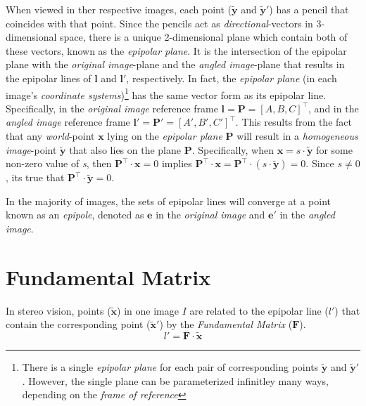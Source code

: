 \par When viewed in ther respective images, each point ($\mathbf{\tilde{y}}$ and $\mathbf{\tilde{y}'}$) has a pencil that coincides with that point. Since the pencils act as \textit{directional}-vectors in 3-dimensional space, there is a unique 2-dimensional plane which contain both of these vectors, known as the \textit{epipolar plane}. It is the intersection of the epipolar plane with the \textit{original image}-plane and the \textit{angled image}-plane that results in the epipolar lines of $\mathbf{l}$ and $\mathbf{l'}$, respectively. In fact, the \textit{epipolar plane} (in each image's \textit{coordinate systems})\footnote{There is a single \textit{epipolar plane} for each pair of corresponding points $\mathbf{\tilde{y}}$ and $\mathbf{\tilde{y}'}$. However, the single plane can be parameterized infinitley many ways, depending on the \textit{frame of reference}} has the same vector form as its epipolar line. Specifically, in the \textit{original image} reference frame $\mathbf{l}=\mathbf{P}=[A,B,C]^\intercal$, and in the \textit{angled image} reference frame $\mathbf{l'}=\mathbf{P'}=[A',B',C']^\intercal$. This results from the fact that any \textit{world}-point $\mathbf{x}$ lying on the \textit{epipolar plane} $\mathbf{P}$ will result in a \textit{homogeneous image}-point $\mathbf{\tilde{y}}$ that also lies on the plane $\mathbf{P}$. Specifically, when $\mathbf{x}=s\cdot\mathbf{\tilde{y}}$ for some non-zero value of \textit{s}, then $\mathbf{P}^\intercal\cdot\mathbf{x}=0$ implies $\mathbf{P}^\intercal\cdot\mathbf{x}=\mathbf{P}^\intercal\cdot(s\cdot\mathbf{\tilde{y}})=0$. Since $s\neq0$, its true that $\mathbf{P}^\intercal\cdot\mathbf{\tilde{y}}=0$. 

\par In the majority of images, the sets of epipolar lines will converge at a point known as an \textit{epipole}, denoted as $\mathbf{e}$ in the \textit{original image} and $\mathbf{e'}$ in the \textit{angled image}. 

\section{Fundamental Matrix}
In stereo vision, points ($\mathbf{\tilde{x}}$) in one image $I$ are related to the epipolar line ($l'$) that contain the corresponding point ($\mathbf{\tilde{x}}'$) by the \textit{Fundamental Matrix} ($\mathbf{F}$).
\begin{equation*}
l'=\mathbf{F}\cdot\mathbf{\tilde{x}}
\end{equation*}

